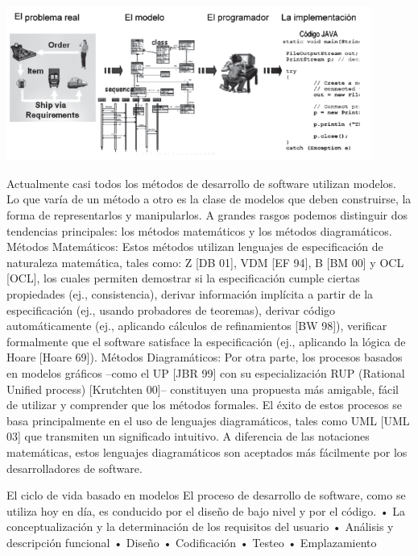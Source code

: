 \begin{flushleft}
\begin{itemize}
\begin{center}
    \includegraphics[width=12cm]{./Imagenes/mdd1}
    \end{center}

Actualmente casi todos los métodos de desarrollo de software utilizan modelos. Lo que varía de un método a otro es la clase de modelos que deben construirse, la forma de representarlos y manipularlos. A grandes rasgos podemos distinguir dos tendencias principales: los métodos matemáticos y los métodos diagramáticos.
Métodos Matemáticos:
Estos métodos utilizan lenguajes de especificación de naturaleza matemática, tales como: Z [DB 01], VDM [EF 94], B [BM 00] y OCL [OCL], los cuales permiten demostrar si la especificación cumple ciertas propiedades (ej., consistencia), derivar información implícita a partir de la especificación (ej., usando probadores de teoremas), derivar código automáticamente (ej., aplicando cálculos de refinamientos [BW 98]), verificar formalmente que el software satisface la especificación (ej., aplicando la lógica de Hoare [Hoare 69]).
Métodos Diagramáticos:
Por otra parte, los procesos basados en modelos gráficos –como el UP [JBR 99] con su especialización RUP (Rational Unified process) [Krutchten 00]– constituyen una propuesta más amigable, fácil de utilizar y comprender que los métodos formales. El éxito de estos procesos se basa principalmente en el uso de lenguajes diagramáticos, tales como UML [UML 03] que transmiten un significado intuitivo. A diferencia de las notaciones matemáticas, estos lenguajes diagramáticos son aceptados más fácilmente por los desarrolladores de software.

El ciclo de vida basado en modelos
El proceso de desarrollo de software, como se utiliza hoy en día, es conducido por el diseño de bajo nivel y por el código.
•	La conceptualización y la determinación de los requisitos del usuario 
•	Análisis y descripción funcional 
•	Diseño 
•	Codificación
•	Testeo 
•	Emplazamiento


\end{itemize}
\end{flushleft}
